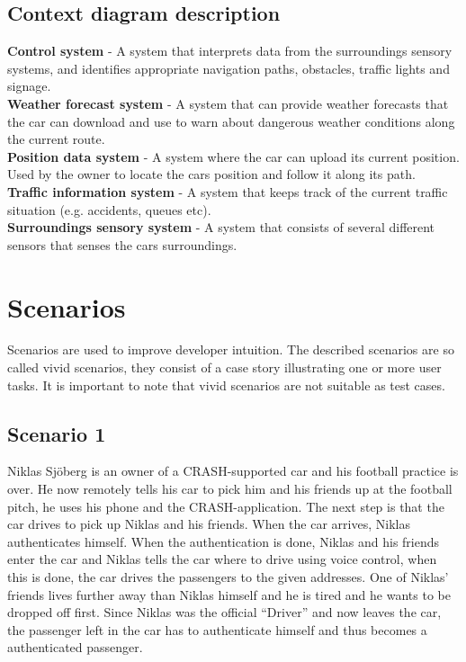 \documentclass{article}
\begin{document}
\subsection{Context diagram description}
\textbf{Control system} - A system that interprets data from the surroundings sensory systems, and identifies appropriate navigation paths, obstacles, traffic lights and signage. \\
\textbf{Weather forecast system} - A system that can provide weather forecasts that the car can download and use to warn about dangerous weather conditions along the current route.  \\
\textbf{Position data system} - A system where the car can upload its current position. Used by the owner to locate the cars position and follow it along its path.  \\
\textbf{Traffic information system} - A system that keeps track of the current traffic situation (e.g. accidents, queues etc). \\
\textbf{Surroundings sensory system} - A system that consists of several different sensors that senses the cars surroundings.  \\


\section{Scenarios}
Scenarios are used to improve developer intuition. The described scenarios are so called vivid scenarios, they consist of a case story illustrating one or more user tasks. It is important to note that vivid scenarios are not suitable as test cases.
\subsection {Scenario 1}
Niklas Sjöberg is an owner of a CRASH-supported car and his football practice is over. He now remotely tells his car to pick him and his friends up at the football pitch, he uses his phone and the CRASH-application. The next step is that the car drives to pick up Niklas and his friends. When the car arrives, Niklas authenticates himself. When the authentication is done, Niklas and his friends enter the car and Niklas tells the car where to drive using voice control, when this is done, the car drives the passengers to the given addresses. One of Niklas’ friends lives further away than Niklas himself and he is tired and he wants to be dropped off first. Since Niklas was the official “Driver” and now leaves the car, the passenger left in the car has to authenticate himself and thus becomes a authenticated passenger. 
\end{document}
